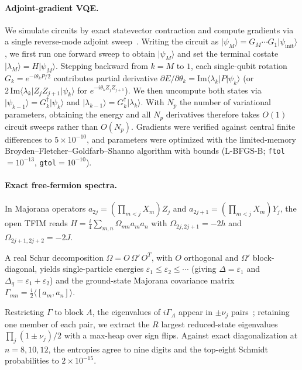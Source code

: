 \documentclass[reprint,aps,pra,floatfix,superscriptaddress,nofootinbib,longbibliography]{revtex4-2}
\theoremstyle{remark}
\theoremstyle{definition}
\newcommand{\ket}[1]{\lvert #1 \rangle}
\newcommand{\bra}[1]{\langle #1 \rvert}
\begin{document}
\paragraph{Adjoint-gradient VQE.}
We simulate circuits by exact statevector contraction and compute gradients via a
single reverse-mode adjoint sweep~\cite{luo2019adjoint}. Writing the circuit as
$\ket{\psi_M}=G_M\cdots G_1\ket{\psi_{\mathrm{init}}}$, we first run one forward
sweep to obtain $\ket{\psi_M}$ and set the terminal costate
$\ket{\lambda_M}=H\ket{\psi_M}$. Stepping backward from $k=M$ to $1$, each
single-qubit rotation $G_k=e^{-i\theta_k P/2}$ contributes partial derivative
$\partial E/\partial\theta_k=\mathrm{Im}\bra{\lambda_k}P\ket{\psi_k}$ (or
$2\,\mathrm{Im}\bra{\lambda_k}Z_jZ_{j+1}\ket{\psi_k}$ for $e^{-i\theta_k Z_jZ_{j+1}}$).
We then uncompute both states via $\ket{\psi_{k-1}}=G_k^\dagger\ket{\psi_k}$ and
$\ket{\lambda_{k-1}}=G_k^\dagger\ket{\lambda_k}$. With $N_p$ the number of variational parameters, obtaining the energy and all
$N_p$ derivatives therefore takes $O(1)$ circuit sweeps rather than $O(N_p)$.
Gradients were verified against central finite differences to
$5\times10^{-10}$, and parameters were optimized with the limited-memory
Broyden--Fletcher--Goldfarb--Shanno algorithm with bounds (L-BFGS-B; \texttt{ftol}$=10^{-13}$, \texttt{gtol}$=10^{-10}$).

\paragraph{Exact free-fermion spectra.}
In Majorana operators $a_{2j}=(\prod_{m<j}X_m)Z_j$ and
$a_{2j+1}=(\prod_{m<j}X_m)Y_j$, the open TFIM reads
$H=\tfrac{i}{4}\sum_{m,n}\Omega_{mn}a_m a_n$ with $\Omega_{2j,2j+1}=-2h$ and
$\Omega_{2j+1,2j+2}=-2J$.

A real Schur decomposition $\Omega=O\,\Omega'\,O^{T}$, with $O$ orthogonal and
$\Omega'$ block-diagonal, yields single-particle energies
$\varepsilon_1\le\varepsilon_2\le\cdots$ (giving $\Delta=\varepsilon_1$ and
$\Delta_q=\varepsilon_1+\varepsilon_2$) and the ground-state Majorana covariance
matrix $\Gamma_{mn}=\tfrac{i}{2}\langle[a_m,a_n]\rangle$.

Restricting $\Gamma$ to block $A$, the eigenvalues of
$i\Gamma_A$ appear in $\pm\nu_j$ pairs~\cite{peschel2003calculation,vidal2003entanglement};
retaining one member of each pair, we extract the $R$ largest reduced-state
eigenvalues $\prod_j(1\pm\nu_j)/2$ with a max-heap over sign flips. Against exact diagonalization at $n=8,10,12$,
the entropies agree to nine digits and the top-eight Schmidt probabilities to $2\times10^{-15}$.
\end{document}
